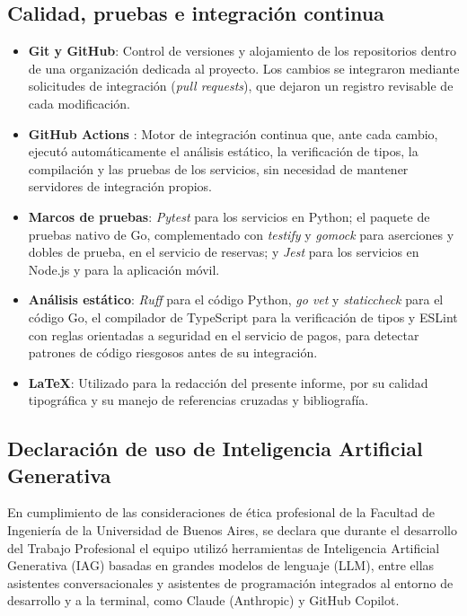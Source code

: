 \subsection{Calidad, pruebas e integración continua}

\begin{itemize}
    \item \textbf{Git y GitHub}: Control de versiones y alojamiento de los repositorios dentro de una organización dedicada al proyecto. Los cambios se integraron mediante solicitudes de integración (\textit{pull requests}), que dejaron un registro revisable de cada modificación.
    \item \textbf{GitHub Actions} \autocite{githubactions}: Motor de integración continua que, ante cada cambio, ejecutó automáticamente el análisis estático, la verificación de tipos, la compilación y las pruebas de los servicios, sin necesidad de mantener servidores de integración propios.
    \item \textbf{Marcos de pruebas}: \textit{Pytest} para los servicios en Python; el paquete de pruebas nativo de Go, complementado con \textit{testify} y \textit{gomock} para aserciones y dobles de prueba, en el servicio de reservas; y \textit{Jest} para los servicios en Node.js y para la aplicación móvil.
    \item \textbf{Análisis estático}: \textit{Ruff} para el código Python, \textit{go vet} y \textit{staticcheck} para el código Go, el compilador de TypeScript para la verificación de tipos y ESLint con reglas orientadas a seguridad en el servicio de pagos, para detectar patrones de código riesgosos antes de su integración.
    \item \textbf{\LaTeX}: Utilizado para la redacción del presente informe, por su calidad tipográfica y su manejo de referencias cruzadas y bibliografía.
\end{itemize}

\subsection{Declaración de uso de Inteligencia Artificial Generativa}

En cumplimiento de las consideraciones de ética profesional de la Facultad de Ingeniería de la Universidad de Buenos Aires, se declara que durante el desarrollo del Trabajo Profesional el equipo utilizó herramientas de Inteligencia Artificial Generativa (IAG) basadas en grandes modelos de lenguaje (LLM), entre ellas asistentes conversacionales y asistentes de programación integrados al entorno de desarrollo y a la terminal, como Claude (Anthropic) y GitHub Copilot.

